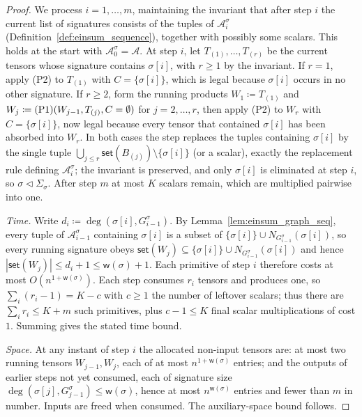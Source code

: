 \documentclass[sn-mathphys, natbib=false]{sn-jnl}
\theoremstyle{plain}
\theoremstyle{definition}
\newcommand{\takesetp}[1]{\mathsf{set}(#1)}
\newcommand{\degp}[2]{\deg(#1,#2)}
\newcommand{\neighborvg}[2]{N_{#2}(#1)}
\newcommand{\less}{O}
\newif\ifshowchanges
\newcommand{\rev}[1]{%
  \ifshowchanges
    {\color{red} #1}%
  \else
    #1%
  \fi
}
\def\calA{\mathcal{A}}
\begin{document}
\begin{bibunit}[agsm]
\begin{proof}
\rev{We process $i = 1, \dots, m$, maintaining the invariant that after step $i$ the current list of signatures consists of the tuples of $\calA^\sigma_i$ (Definition~\ref{def:einsum_sequence}), together with possibly some scalars. This holds at the start with $\calA^\sigma_0 = \calA$. At step $i$, let $T_{(1)}, \dots, T_{(r)}$ be the current tensors whose signature contains $\sigma[i]$, with $r \ge 1$ by the invariant. If $r = 1$, apply (P2) to $T_{(1)}$ with $C = \{\sigma[i]\}$, which is legal because $\sigma[i]$ occurs in no other signature. If $r \ge 2$, form the running products $W_1 \coloneqq T_{(1)}$ and $W_j \coloneqq \textnormal{(P1)}(W_{j-1}, T_{(j)}, C = \emptyset)$ for $j = 2, \dots, r$, then apply (P2) to $W_r$ with $C = \{\sigma[i]\}$, now legal because every tensor that contained $\sigma[i]$ has been absorbed into $W_r$. In both cases the step replaces the tuples containing $\sigma[i]$ by the single tuple $\bigcup_{j \le r} \takesetp{B_{(j)}} \setminus \{\sigma[i]\}$ (or a scalar), exactly the replacement rule defining $\calA^\sigma_i$; the invariant is preserved, and only $\sigma[i]$ is eliminated at step $i$, so $\sigma \vartriangleleft \Sigma_\sigma$. After step $m$ at most $K$ scalars remain, which are multiplied pairwise into one.

\emph{Time.} Write $d_i \coloneqq \degp{\sigma[i]}{G^\sigma_{i-1}}$. By Lemma~\ref{lem:einsum_graph_seq}, every tuple of $\calA^\sigma_{i-1}$ containing $\sigma[i]$ is a subset of $\{\sigma[i]\} \cup \neighborvg{\sigma[i]}{G^\sigma_{i-1}}$, so every running signature obeys $\takesetp{W_j} \subseteq \{\sigma[i]\} \cup \neighborvg{\sigma[i]}{G^\sigma_{i-1}}$ and hence $|\takesetp{W_j}| \le d_i + 1 \le \mathsf{w}(\sigma) + 1$. Each primitive of step $i$ therefore costs at most $\less(n^{1 + \mathsf{w}(\sigma)})$. Each step consumes $r_i$ tensors and produces one, so $\sum_i (r_i - 1) = K - c$ with $c \ge 1$ the number of leftover scalars; thus there are $\sum_i r_i \le K + m$ such primitives, plus $c - 1 \le K$ final scalar multiplications of cost $1$. Summing gives the stated time bound.

\emph{Space.} At any instant of step $i$ the allocated non-input tensors are: at most two running tensors $W_{j-1}, W_j$, each of at most $n^{1 + \mathsf{w}(\sigma)}$ entries; and the outputs of earlier steps not yet consumed, each of signature size $\degp{\sigma[j]}{G^\sigma_{j-1}} \le \mathsf{w}(\sigma)$, hence at most $n^{\mathsf{w}(\sigma)}$ entries and fewer than $m$ in number. Inputs are freed when consumed. The auxiliary-space bound follows.}
\end{proof}


\end{bibunit}
\end{document}
